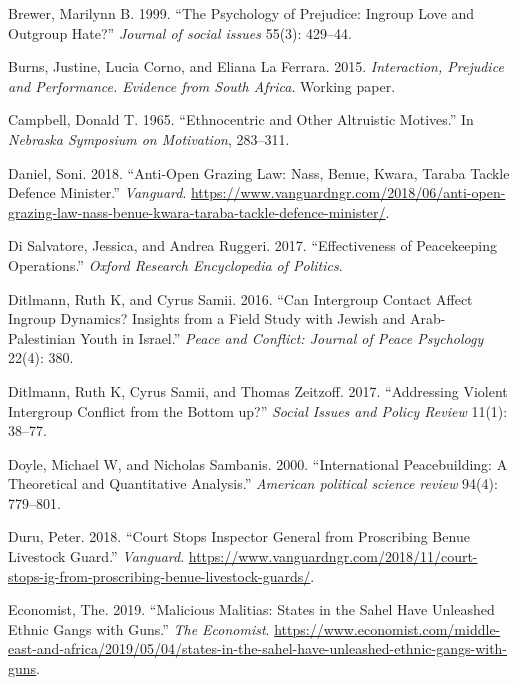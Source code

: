 \documentclass[11pt]{article}
\begin{document}
\hypertarget{ref-brewer1999ingroupOutgroup}{}
Brewer, Marilynn B. 1999. ``The Psychology of Prejudice: Ingroup Love
and Outgroup Hate?'' \emph{Journal of social issues} 55(3): 429--44.

\hypertarget{ref-burns2015interaction}{}
Burns, Justine, Lucia Corno, and Eliana La Ferrara. 2015.
\emph{Interaction, Prejudice and Performance. Evidence from South
Africa}. Working paper.

\hypertarget{ref-campbell1965ethno}{}
Campbell, Donald T. 1965. ``Ethnocentric and Other Altruistic Motives.''
In \emph{Nebraska Symposium on Motivation}, 283--311.

\hypertarget{ref-daniel2018anti}{}
Daniel, Soni. 2018. ``Anti-Open Grazing Law: Nass, Benue, Kwara, Taraba
Tackle Defence Minister.'' \emph{Vanguard}.
\url{https://www.vanguardngr.com/2018/06/anti-open-grazing-law-nass-benue-kwara-taraba-tackle-defence-minister/}.

\hypertarget{ref-di2017effectiveness}{}
Di Salvatore, Jessica, and Andrea Ruggeri. 2017. ``Effectiveness of
Peacekeeping Operations.'' \emph{Oxford Research Encyclopedia of
Politics}.

\hypertarget{ref-ditlmann2016can}{}
Ditlmann, Ruth K, and Cyrus Samii. 2016. ``Can Intergroup Contact Affect
Ingroup Dynamics? Insights from a Field Study with Jewish and
Arab-Palestinian Youth in Israel.'' \emph{Peace and Conflict: Journal of
Peace Psychology} 22(4): 380.

\hypertarget{ref-ditlmann2017addressing}{}
Ditlmann, Ruth K, Cyrus Samii, and Thomas Zeitzoff. 2017. ``Addressing
Violent Intergroup Conflict from the Bottom up?'' \emph{Social Issues
and Policy Review} 11(1): 38--77.

\hypertarget{ref-doyle2000international}{}
Doyle, Michael W, and Nicholas Sambanis. 2000. ``International
Peacebuilding: A Theoretical and Quantitative Analysis.'' \emph{American
political science review} 94(4): 779--801.

\hypertarget{ref-duru2018court}{}
Duru, Peter. 2018. ``Court Stops Inspector General from Proscribing
Benue Livestock Guard.'' \emph{Vanguard}.
\url{https://www.vanguardngr.com/2018/11/court-stops-ig-from-proscribing-benue-livestock-guards/}.

\hypertarget{ref-economist2019militias}{}
Economist, The. 2019. ``Malicious Malitias: States in the Sahel Have
Unleashed Ethnic Gangs with Guns.'' \emph{The Economist}.
\url{https://www.economist.com/middle-east-and-africa/2019/05/04/states-in-the-sahel-have-unleashed-ethnic-gangs-with-guns}.
\end{document}
